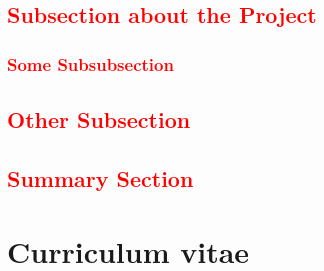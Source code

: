 \textcolor{red}{\blindtext[2]}

\begin{figure}
\begin{center}
  \caption{\textcolor{red}{\blindtext}}
  \label{fig:example}
\end{center}
\vspace{-0.5cm}
\end{figure}

\textcolor{red}{\blindtext[2]}

\subsection*{\textcolor{red}{Subsection about the Project}}

\textcolor{red}{\blindtext[2]}

\subsubsection*{\textcolor{red}{Some Subsubsection}}

\textcolor{red}{\blindtext[2]}

\subsection*{\textcolor{red}{Other Subsection}}

\textcolor{red}{\blindtext[2]}

\subsection*{\textcolor{red}{Summary Section}}

\textcolor{red}{\blindtext[2]}


\nocite{*} %

\renewcommand\bibsection{\subsection*{\refname}}
\begin{small}


\end{small}

\newpage
\section{Curriculum vitae}

